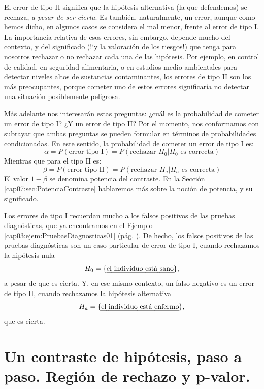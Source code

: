 El {\sf error de tipo II} significa que la hipótesis alternativa (la que defendemos) se rechaza, {\em a pesar de ser cierta}. Es también, naturalmente, un error, aunque como hemos dicho, en algunos casos se considera el mal menor, frente al error de tipo I. La importancia relativa de esos errores, sin embargo, depende mucho del contexto, y del significado ({!`}y la valoración de los riesgos!) que tenga para nosotros rechazar o no rechazar cada una  de las hipótesis. Por ejemplo, en control de calidad, en seguridad alimentaria, o en estudios medio ambientales para detectar niveles altos de sustancias contaminantes, los errores de tipo II son los más preocupantes, porque cometer uno de estos errores significaría no detectar una situación posiblemente peligrosa.

Más adelante nos interesarán estas preguntas: ¿cuál es la probabilidad de cometer un error de tipo I? ¿Y un error de tipo II? Por el momento, nos conformamos con subrayar que ambas preguntas se pueden formular en términos de probabilidades condicionadas. En este sentido, la probabilidad de cometer un error de tipo I es:
    \begin{equation}\label{cap07:ecu:AlfaErrorTipoI}
        \alpha=P(\mbox{error tipo I})=P(\mbox{rechazar $H_0$}|\mbox{$H_0$ es correcta})
    \end{equation}
Mientras que para el tipo II es:
    \begin{equation}\label{cap07:ecu:BetaErrorTipoII}
        \beta=P(\mbox{error tipo II})=P(\mbox{rechazar $H_a$}|\mbox{$H_a$ es correcta})
    \end{equation}
El valor $1-\beta$ se denomina {\sf potencia del contraste}. En la Sección \ref{cap07:sec:PotenciaContraste} hablaremos más sobre la noción de potencia, y  su significado.

Los errores de tipo I recuerdan mucho a los falsos positivos de las pruebas diagnósticas, que ya encontramos en el Ejemplo \ref{cap03:ejem:PruebasDiagnosticas01} (pág. \pageref{cap03:ejem:PruebasDiagnosticas01}). De hecho, los falsos positivos de las pruebas diagnósticas son un caso particular de error de tipo I, cuando rechazamos la hipótesis nula
    \[H_0=\{\mbox{\em el individuo está sano}\},\]
a pesar de que es cierta. Y, en ese mismo contexto, un falso negativo es un error de tipo II, cuando rechazamos la hipótesis alternativa
    \[H_a=\{\mbox{\em el individuo está enfermo}\},\]
que es cierta.

\section{Un contraste de hipótesis, paso a paso. Región de rechazo y p-valor.}
\label{cap07:sec:ContrasteHipotesisPasoaPaso}

